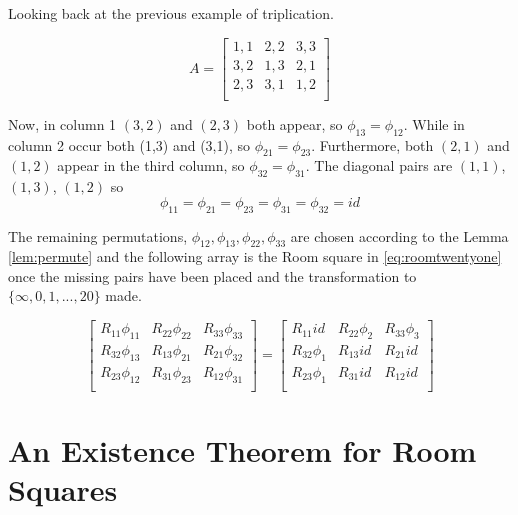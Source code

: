 \documentclass[
  11pt,
  a4paper]{book}
\newcounter{example}
\begin{document}
\begin{example}
Looking back at the previous example of triplication.

\begin{equation}
 A = \begin{bmatrix}
  1,1 & 2,2 & 3,3 \\
  3,2 & 1,3 & 2,1 \\
  2,3 & 3,1 & 1,2 \\
 \end{bmatrix}
\end{equation}

Now, in column 1 $(3, 2)$ and $(2, 3)$ both appear, so
$\phi _{13} = \phi _{12}$.
While in column 2 occur both (1,3) and
(3,1), so $\phi _{21} = \phi _{23}$.
Furthermore, both $(2, 1)$ and $(1, 2)$ appear in the third
column, so $\phi _{32} = \phi _{31}$.
The diagonal pairs are $(1, 1)$, $(1, 3)$, $(1, 2)$ so
\begin{equation}
\phi _{11} = \phi _{21} = \phi _{23} = \phi _{31} = \phi _{32} = id
\end{equation}

The remaining permutations,
$\phi _{12}, \phi _{13}, \phi _{22}, \phi _{33}$ are chosen
according to the Lemma \ref{lem:permute}
and the following array is the Room square in \ref{eq:roomtwentyone} once
the missing pairs have been placed and the transformation to
$\{\infty, 0, 1, ..., 20\}$ made.

\begin{equation}
  \begin{bmatrix}
   R_{11}\phi_{11} & R_{22}\phi_{22} & R_{33}\phi_{33} \\
   R_{32}\phi_{13} & R_{13}\phi_{21} & R_{21}\phi_{32} \\
   R_{23}\phi_{12} & R_{31}\phi_{23} & R_{12}\phi_{31} \\
  \end{bmatrix}
  =
  \begin{bmatrix}
      R_{11}id    & R_{22}\phi_{2} & R_{33}\phi_{3} \\
   R_{32}\phi_{1} &   R_{13}id     &    R_{21}id    \\
   R_{23}\phi_{1} &   R_{31}id     &    R_{12}id    \\
  \end{bmatrix}
\end{equation}

\end{example}

\hypertarget{an-existence-theorem-for-room-squares}{%
\chapter{An Existence Theorem for Room
Squares}\label{an-existence-theorem-for-room-squares}}
\end{document}
